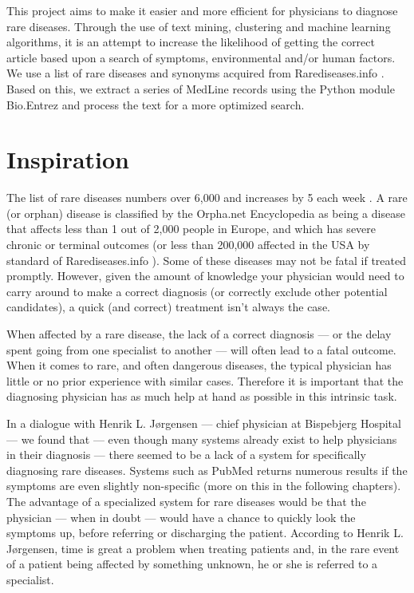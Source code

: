 This project aims to make it easier and more efficient for physicians
to diagnose rare diseases. Through the use of text mining,
clustering and machine learning algorithms, it is an attempt to
increase the likelihood of getting the correct article based upon a
search of symptoms, environmental and/or human factors. We use a list
of rare diseases and synonyms acquired from Rarediseases.info
\cite{Rarediseases}. Based on this, we
extract a series of MedLine records \cite{PubMedFactSheetMedline}
using the Python module Bio.Entrez \cite{EntrezProgUtil} and process
the text for a more optimized search.

\section{Inspiration}

The list of rare diseases numbers over 6,000 and increases by 5 each
week \cite{AboutRareDiseasesOrphanet}. A rare (or orphan) disease is
classified by the Orpha.net Encyclopedia \cite{OrphanetEncyclopedia}
as being a disease that affects less than 1 out of 2,000 people in
Europe, and which has severe chronic or terminal outcomes (or less
than 200,000 affected in the USA by standard of Rarediseases.info
\cite{Rarediseases}). Some of these  diseases may not be fatal if treated promptly. However,
given the amount of knowledge your physician would need to carry
around to make a correct diagnosis (or correctly exclude other
potential candidates), a quick (and correct) treatment isn't always the case.

When affected by a rare disease, the lack of a correct diagnosis
--- or the delay spent going from one specialist to another --- will
often lead to a fatal outcome. When it comes to rare, and often
dangerous diseases, the typical physician has little or no prior
experience with similar cases. Therefore it is important that the
diagnosing physician has as much help at hand as possible in this
intrinsic task.

In a dialogue with Henrik L. J\o rgensen \cite{TheDude} --- chief
physician at Bispebjerg Hospital --- we found that --- even though
many systems already exist to help physicians in their diagnosis ---
there seemed to be a lack of a system for specifically diagnosing rare
diseases. Systems such as PubMed returns numerous results if the
symptoms are even slightly non-specific (more on this in the following
chapters). The advantage of a specialized system for rare diseases
would be that the physician --- when in doubt --- would have a chance
to quickly look the symptoms up, before referring or discharging the
patient. According to Henrik L. J\o rgensen, time is great a problem
when treating patients and, in the rare event of a patient being
affected by something unknown, he or she is referred to a specialist.

